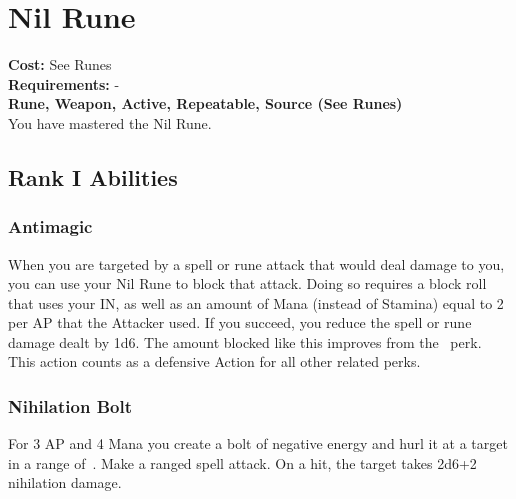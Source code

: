 \section{Nil Rune}\label{rune:nil}
\textbf{Cost:} See Runes\\
\textbf{Requirements:} -\\
\textbf{Rune, Weapon, Active, Repeatable, Source (See Runes)}\\
You have mastered the Nil Rune.

\subsection{Rank I Abilities}

\subsubsection{Antimagic}
When you are targeted by a spell or rune attack that would deal damage to you, you can use your Nil Rune to block that attack.
Doing so requires a block roll that uses your IN, as well as an amount of Mana (instead of Stamina) equal to 2 per AP that the Attacker used.
If you succeed, you reduce the spell or rune damage dealt by 1d6.
The amount blocked like this improves from the~ perk.
This action counts as a defensive Action for all other related perks.

\subsubsection{Nihilation Bolt}
For 3 AP and 4 Mana you create a bolt of negative energy and hurl it at a target in a range of~.
Make a ranged spell attack.
On a hit, the target takes 2d6+2 nihilation damage.